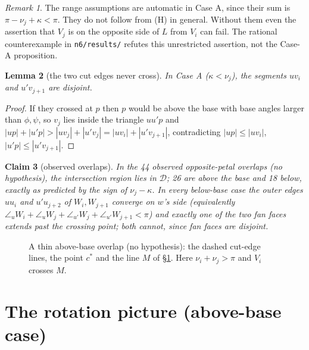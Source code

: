 \documentclass[11pt]{article}
\newtheorem{lemma}{Lemma}
\newtheorem{claim}[lemma]{Claim}
\theoremstyle{definition}
\theoremstyle{remark}
\newtheorem{remark}[lemma]{Remark}
\newcommand{\D}{\mathcal{D}}
\begin{document}
\begin{remark}
The range assumptions are automatic in Case A, since their sum is
$\pi-\nu_j+\kappa<\pi$. They do not follow from (H) in general.
Without them even the assertion that $V_j$ is on the opposite side of $L$
from $V_i$ can fail. The rational counterexample in \texttt{n6/results/}
refutes this unrestricted assertion, not the Case-A proposition.
\end{remark}

\begin{lemma}[the two cut edges never cross]\label{nocross}
In Case A ($\kappa<\nu_j$), the segments $uv_i$ and $u'v_{j+1}$ are disjoint.
\end{lemma}
\begin{proof}
If they crossed at $p$ then $p$ would be above the base with base angles larger than $\phi,\psi$, so $v_j$
lies inside the triangle $uu'p$ and $|up|+|u'p|>|uv_j|+|u'v_j|=|uv_i|+|u'v_{j+1}|$, contradicting
$|up|\le|uv_i|$, $|u'p|\le|u'v_{j+1}|$.
\end{proof}

\begin{claim}[observed overlaps]
In the 44 observed opposite-petal overlaps (no hypothesis), the intersection region lies in $\D$; 26 are above
the base and 18 below, exactly as predicted by the sign of $\nu_j-\kappa$. In every below-base case the outer
edges $uu_i$ and $u'u_{j+2}$ of $W_i,W_{j+1}$ converge on $w$'s side (equivalently
$\angle_u W_i+\angle_u W_j+\angle_{u'}W_j+\angle_{u'}W_{j+1}<\pi$) and exactly one of the two fan faces
extends past the crossing point; both cannot, since fan faces are disjoint.
\end{claim}

\begin{figure}[h]\centering
\resizebox{0.9\linewidth}{!}{}
\caption{A thin above-base overlap (no hypothesis): the dashed cut-edge lines, the point $c^*$ and the line $M$
of \S\ref{sec:cstar}. Here $\nu_i+\nu_j>\pi$ and $V_i$ crosses $M$.}
\end{figure}

\section{The rotation picture (above-base case)}\label{sec:cstar}
\end{document}
